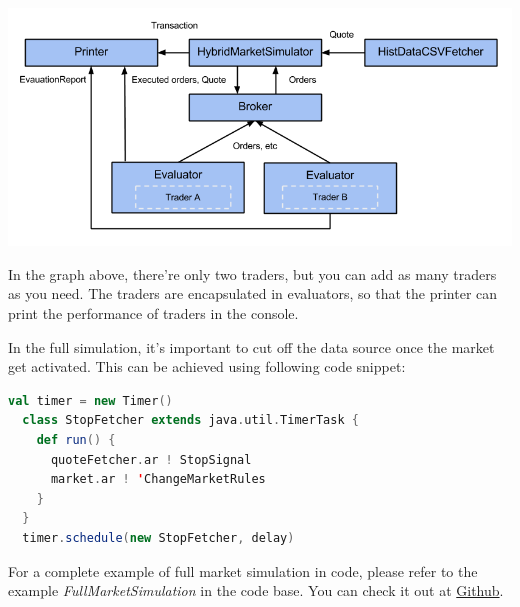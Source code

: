 \noindent
\includegraphics[width=\textwidth]{img/examples/full-simulation}

In the graph above, there're only two traders, but you can add as many traders as you need. The traders are encapsulated in evaluators, so that the printer can print the performance of traders in the console.

In the full simulation, it's important to cut off the data source once the market get activated. This can be achieved using following code snippet:

\begin{lstlisting}[language=Scala]
  val timer = new Timer()
  class StopFetcher extends java.util.TimerTask {
    def run() {
      quoteFetcher.ar ! StopSignal
      market.ar ! 'ChangeMarketRules
    }
  }
  timer.schedule(new StopFetcher, delay)
\end{lstlisting}

For a complete example of full market simulation in code, please refer to the example \emph{FullMarketSimulation} in the code base. You can check it out at \href{https://github.com/merlinND/TradingSimulation/blob/master/ts/src/main/scala/ch/epfl/ts/example/FullMarketSimulation.scala}{Github}.

